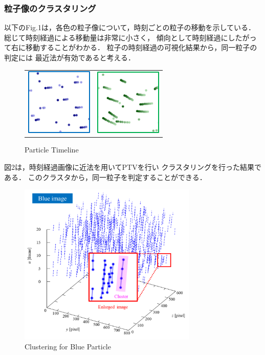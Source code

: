\documentclass[twocolumn,a4j]{jsarticle}
\begin{document}
\subsubsection*{粒子像のクラスタリング}
以下のFig.1は，各色の粒子像について，時刻ごとの粒子の移動を示している．
総じて時刻経過による移動量は非常に小さく，
傾向として時刻経過にしたがって右に移動することがわかる．
粒子の時刻経過の可視化結果から，同一粒子の判定には
最近法が有効であると考える．

\begin{figure}[htbp]
	\begin{tabular}{cc}
		\begin{minipage}[t]{0.45\hsize}
			\centering
			\includegraphics[keepaspectratio, width=32mm]{../images/time-line_blue.png}
			\subcaption{Blue}
		\end{minipage} &
		\begin{minipage}[t]{0.45\hsize}
			\centering
			\includegraphics[keepaspectratio, width=32mm]{../images/time-line_green.png}
			\subcaption{Green}
		\end{minipage}
	\end{tabular}
	\caption{Particle Timeline}
\end{figure}

図2は，時刻経過画像に近法を用いてPTVを行い
クラスタリングを行った結果である．
このクラスタから，同一粒子を判定することができる．
\begin{figure}[htbp]
	\includegraphics[keepaspectratio, width=85mm]{../images/cluster_for_b.png}
	\caption{Clustering for Blue Particle}
\end{figure}
\end{document}
